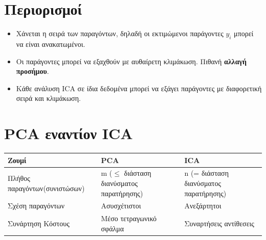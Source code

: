 \documentclass[22pt,a4paper]{article}
\theoremstyle{definition}
\begin{document}
\section*{Περιορισμοί}

\begin{itemize}
  \item Χάνεται η σειρά των παραγόντων, δηλαδή οι εκτιμώμενοι παράγοντες $y_i$ μπορεί να είναι ανακατωμένοι.
  \item Οι παράγοντες μπορεί να εξαχθούν με αυθαίρετη κλιμάκωση. Πιθανή \textbf{αλλαγή προσήμου}.
  \item Κάθε ανάλυση ICA σε ίδια δεδομένα μπορεί να εξάγει παράγοντες με διαφορετική σειρά και κλιμάκωση.
\end{itemize}

\section*{PCA εναντίον ICA}

\begin{center}
  \begin{tabular}{|p{50mm}|p{40mm}|p{40mm}|}
    \hline
    Ζουμί                         & PCA                                         & ICA                                    \\
    \hline
    Πλήθος παραγόντων(συνιστώσων) & m ($\leq$ διάσταση διανύσματος παρατήρησης) & n (= διάσταση διανύσματος παρατήρησης) \\
    \hline
    Σχέση παραγόντων              & Ασυσχέτιστοι                                & Ανεξάρτητοι                            \\
    \hline
    Συνάρτηση Κόστους             & Μέσο τετραγωνικό σφάλμα                     & Συναρτήσεις αντίθεσεις                 \\
    \hline
  \end{tabular}
\end{center}
\end{document}
